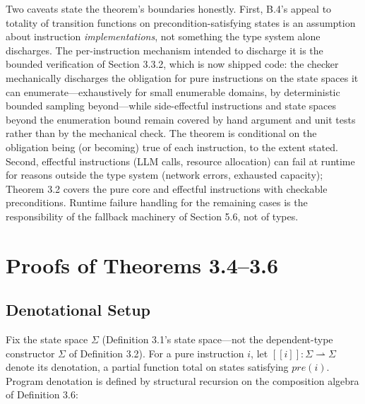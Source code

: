 \documentclass[
  11pt,
]{article}
\newcommand{\llbracket}{[\![}
\newcommand{\rrbracket}{]\!]}
\begin{document}
Two caveats state the theorem's boundaries honestly. First, B.4's appeal
to totality of transition functions on precondition-satisfying states is
an assumption about instruction \emph{implementations}, not something
the type system alone discharges. The per-instruction mechanism intended
to discharge it is the bounded verification of Section 3.3.2, which is
now shipped code: the checker mechanically discharges the obligation for
pure instructions on the state spaces it can enumerate---exhaustively
for small enumerable domains, by deterministic bounded sampling
beyond---while side-effectful instructions and state spaces beyond the
enumeration bound remain covered by hand argument and unit tests rather
than by the mechanical check. The theorem is conditional on the
obligation being (or becoming) true of each instruction, to the extent
stated. Second, effectful instructions (LLM calls, resource allocation)
can fail at runtime for reasons outside the type system (network errors,
exhausted capacity); Theorem 3.2 covers the pure core and effectful
instructions with checkable preconditions. Runtime failure handling for
the remaining cases is the responsibility of the fallback machinery of
Section 5.6, not of types.

\section{Proofs of Theorems 3.4--3.6}\label{proofs-of-theorems-3.43.6}

\subsection{Denotational Setup}\label{denotational-setup}

Fix the state space \(\Sigma\) (Definition 3.1's state space---not the
dependent-type constructor \(\Sigma\) of Definition 3.2). For a pure
instruction \(i\), let
\(\llbracket i \rrbracket : \Sigma \rightharpoonup \Sigma\) denote its
denotation, a partial function total on states satisfying \(pre(i)\).
Program denotation is defined by structural recursion on the composition
algebra of Definition 3.6:
\end{document}
